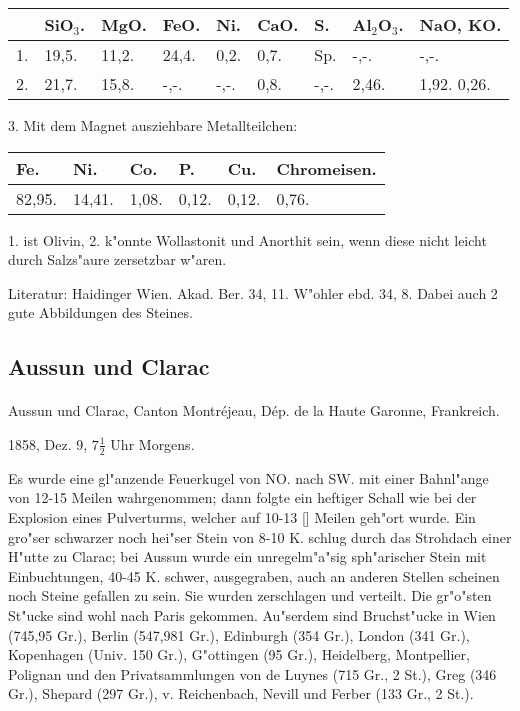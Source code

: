 \documentclass[a4paper, 11pt, oneside]{article}
\begin{document}
\begin{table}[H]
    \centering
    \begin{tabular}{l l l l l l l l l}
         & SiO$_{3}$. & MgO. & FeO. & Ni. & CaO. & S. & Al$_{2}$O$_{3}$. & NaO, KO. \\ \hline
        1. & 19,5. & 11,2. & 24,4. & 0,2. & 0,7. & Sp. & -,-. & -,-. \\
        2. & 21,7. & 15,8. & -,-. & -,-. & 0,8. & -,-. & 2,46. & 1,92. 0,26. \\
    \end{tabular}
\end{table}

\begin{center}
3. Mit dem Magnet ausziehbare Metallteilchen:
\end{center}

\begin{table}[H]
    \centering
    \begin{tabular}{l l l l l l}
        Fe. & Ni. & Co. & P. & Cu. & Chromeisen. \\ \hline
        82,95. & 14,41. & 1,08. & 0,12. & 0,12. & 0,76. \\
    \end{tabular}
\end{table}

1. ist Olivin, 2. k"onnte Wollastonit und Anorthit sein, wenn diese nicht leicht durch Salzs"aure zersetzbar w"aren.

\footnotesize
Literatur: Haidinger Wien. Akad. Ber. 34, 11. W"ohler ebd. 34, 8. Dabei auch 2 gute Abbildungen des Steines.

\subsection{Aussun und Clarac}
\normalsize
\paragraph{}
Aussun und Clarac, Canton Montréjeau, Dép. de la Haute Garonne, Frankreich.

1858, Dez. 9, $7\frac{1}{2}$ Uhr Morgens.

Es wurde eine gl"anzende Feuerkugel von NO. nach SW. mit einer Bahnl"ange von 12-15 Meilen wahrgenommen; dann folgte ein heftiger Schall wie bei der Explosion eines Pulverturms, welcher auf 10-13 [] Meilen geh"ort wurde. Ein gro"ser schwarzer noch hei"ser Stein von 8-10 K. schlug durch das Strohdach einer H"utte zu Clarac; bei Aussun wurde ein unregelm"a"sig sph"arischer Stein mit Einbuchtungen, 40-45 K. schwer, ausgegraben, auch an anderen Stellen scheinen noch Steine gefallen zu sein. Sie wurden zerschlagen und verteilt. Die gr"o"sten St"ucke sind wohl nach Paris gekommen. Au"serdem sind Bruchst"ucke in Wien (745,95 Gr.), Berlin (547,981 Gr.), Edinburgh (354 Gr.), London (341 Gr.), Kopenhagen (Univ. 150 Gr.), G"ottingen (95 Gr.), Heidelberg, Montpellier, Polignan und den Privatsammlungen von de Luynes (715 Gr., 2 St.), Greg (346 Gr.), Shepard (297 Gr.), v. Reichenbach, Nevill und Ferber (133 Gr., 2 St.).
\end{document}
